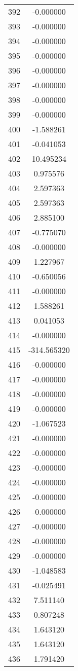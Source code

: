 \documentclass[12pt]{article}
\begin{document}
\begin{longtable}{@{}cc@{}}
392 & -0.000000 \\
393 & -0.000000 \\
394 & -0.000000 \\
395 & -0.000000 \\
396 & -0.000000 \\
397 & -0.000000 \\
398 & -0.000000 \\
399 & -0.000000 \\
400 & -1.588261 \\
401 & -0.041053 \\
402 & 10.495234 \\
403 & 0.975576 \\
404 & 2.597363 \\
405 & 2.597363 \\
406 & 2.885100 \\
407 & -0.775070 \\
408 & -0.000000 \\
409 & 1.227967 \\
410 & -0.650056 \\
411 & -0.000000 \\
412 & 1.588261 \\
413 & 0.041053 \\
414 & -0.000000 \\
415 & -314.565320 \\
416 & -0.000000 \\
417 & -0.000000 \\
418 & -0.000000 \\
419 & -0.000000 \\
420 & -1.067523 \\
421 & -0.000000 \\
422 & -0.000000 \\
423 & -0.000000 \\
424 & -0.000000 \\
425 & -0.000000 \\
426 & -0.000000 \\
427 & -0.000000 \\
428 & -0.000000 \\
429 & -0.000000 \\
430 & -1.048583 \\
431 & -0.025491 \\
432 & 7.511140 \\
433 & 0.807248 \\
434 & 1.643120 \\
435 & 1.643120 \\
436 & 1.791420 \\

\end{longtable}
\end{document}
